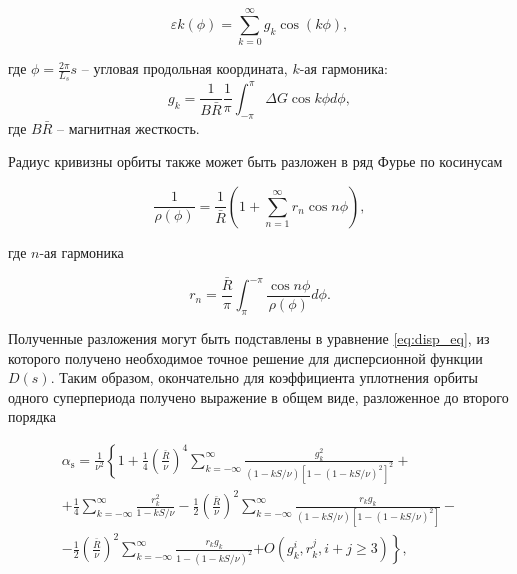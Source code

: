 \begin{equation}
\varepsilon k\left(\phi\right)=\sum_{k=0}^{\infty}g_{k}\cos(k\phi),
\label{eq:superperiodicity_fourier}
\end{equation}

\noindent где $\phi=\frac{2\pi}{L_s}s$ -- угловая продольная координата, $k$-ая гармоника:
\begin{equation}
g_k=\frac{1}{B\bar{R}} \frac{1}{\pi} \int_{-\pi}^\pi \Delta G \cos k \phi d \phi,
\end{equation}
\noindent где $B\bar{R}$ -- магнитная жесткость.

\noindent Радиус кривизны орбиты также может быть разложен в ряд Фурье по косинусам

\begin{equation}
\frac{1}{\rho(\phi)}=\frac{1}{\bar{R}}\left(1+\sum_{n=1}^{\infty} r_n \cos n \phi\right),
\end{equation}

\noindent где $n$-ая гармоника

\begin{equation}
r_n=\frac{\bar{R}}{\pi} \int_\pi^{-\pi} \frac{\cos n \phi}{\rho(\phi)} d \phi.
\end{equation}

\noindent Полученные разложения могут быть подставлены в уравнение \ref{eq:disp_eq}, из которого получено необходимое точное решение для дисперсионной функции $D(s)$. Таким образом, окончательно для коэффициента уплотнения орбиты одного суперпериода получено выражение в общем виде, разложенное до второго порядка

\begin{equation}
\begin{gathered}
\alpha_{\text{s}}=\frac{1}{\nu^2}\left\{1+\frac{1}{4}\left(\frac{\bar{R}}{\nu}\right)^4 \sum_{k=-\infty}^{\infty}\right.
\frac{g_k^2}{(1-k S / \nu)\left[1-(1-k S / \nu)^2\right]^2}+ \\
+\frac{1}{4} \sum_{k=-\infty}^{\infty} \frac{r_k^2}{1-k S / \nu} -\frac{1}{2}\left(\frac{\bar{R}}{\nu}\right)^2 \sum_{k=-\infty}^{\infty} \frac{r_k g_k}{(1-k S / \nu)\left[1-(1-k S / \nu)^2\right]} - \\
-\frac{1}{2}\left(\frac{\bar{R}}{\nu}\right)^2 \sum_{k=-\infty}^{\infty} \frac{r_k g_k}{1-(1-k S / \nu)^2}
\left.+O\left(g_k^i, r_k^j, i+j \geq 3\right)\right\},
\end{gathered}
\label{eq:alpha_general}
\end{equation}

